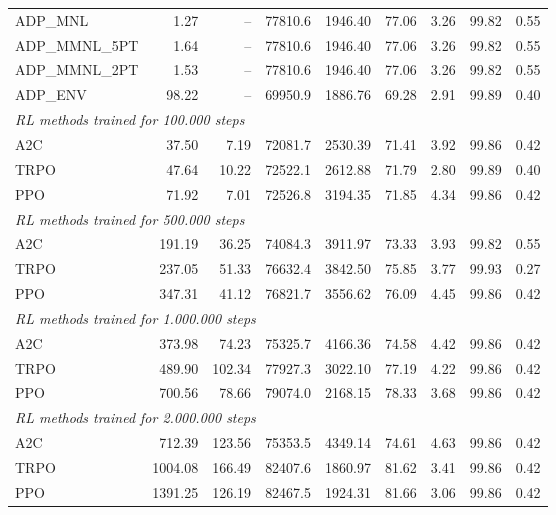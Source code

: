 \begin{samepage}
\begin{center}
\begin{tabular}{l|rr|rr|rr|rr}
    \midrule
    ADP\_MNL     &     1.27 &    -- &    77810.6 &    1946.40 &   77.06 &    3.26 &   99.82 &    0.55 \\
    ADP\_MMNL\_5PT &     1.64 &    -- &    77810.6 &    1946.40 &   77.06 &    3.26 &   99.82 &    0.55 \\
    ADP\_MMNL\_2PT &     1.53 &    -- &    77810.6 &    1946.40 &   77.06 &    3.26 &   99.82 &    0.55 \\
    ADP\_ENV     &    98.22 &    -- &    69950.9 &    1886.76 &   69.28 &    2.91 &   99.89 &    0.40 \\
    \midrule
    \multicolumn{9}{l}{\textit{RL methods trained for 100.000 steps}} \\
    \midrule
    A2C          &    37.50 &     7.19 &    72081.7 &    2530.39 &   71.41 &    3.92 &   99.86 &    0.42 \\
    TRPO         &    47.64 &    10.22 &    72522.1 &    2612.88 &   71.79 &    2.80 &   99.89 &    0.40 \\
    PPO          &    71.92 &     7.01 &    72526.8 &    3194.35 &   71.85 &    4.34 &   99.86 &    0.42 \\
    \midrule
    \multicolumn{9}{l}{\textit{RL methods trained for 500.000 steps}} \\
    \midrule
    A2C          &   191.19 &    36.25 &    74084.3 &    3911.97 &   73.33 &    3.93 &   99.82 &    0.55 \\
    TRPO         &   237.05 &    51.33 &    76632.4 &    3842.50 &   75.85 &    3.77 &   99.93 &    0.27 \\
    PPO          &   347.31 &    41.12 &    76821.7 &    3556.62 &   76.09 &    4.45 &   99.86 &    0.42 \\
    \midrule
    \multicolumn{9}{l}{\textit{RL methods trained for 1.000.000 steps}} \\
    \midrule
    A2C          &   373.98 &    74.23 &    75325.7 &    4166.36 &   74.58 &    4.42 &   99.86 &    0.42 \\
    TRPO         &   489.90 &   102.34 &    77927.3 &    3022.10 &   77.19 &    4.22 &   99.86 &    0.42 \\
    PPO          &   700.56 &    78.66 &    79074.0 &    2168.15 &   78.33 &    3.68 &   99.86 &    0.42 \\
    \midrule
    \multicolumn{9}{l}{\textit{RL methods trained for 2.000.000 steps}} \\
    \midrule
    A2C          &   712.39 &   123.56 &    75353.5 &    4349.14 &   74.61 &    4.63 &   99.86 &    0.42 \\
    TRPO         &  1004.08 &   166.49 &    82407.6 &    1860.97 &   81.62 &    3.41 &   99.86 &    0.42 \\
    PPO          &  1391.25 &   126.19 &    82467.5 &    1924.31 &   81.66 &    3.06 &   99.86 &    0.42 \\
    \bottomrule
  \end{tabular}
\end{center}
\end{samepage}

